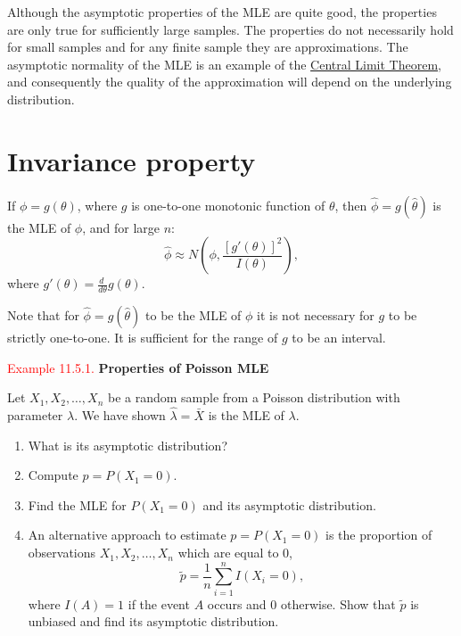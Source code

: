 \documentclass[
]{book}
\providecommand{\tightlist}{%
  \setlength{\itemsep}{0pt}\setlength{\parskip}{0pt}}
\begin{document}
Although the asymptotic properties of the MLE are quite good, the properties are only true for sufficiently large samples. The properties do not necessarily hold for small samples and for any finite sample they are approximations. The asymptotic normality of the MLE is an example of the \protect\hyperlink{Sec_CLT:statement}{Central Limit Theorem}, and consequently the quality of the approximation will depend on the underlying distribution.

\hypertarget{MLEprop:invariance}{%
\section{Invariance property}\label{MLEprop:invariance}}

If \(\phi = g(\theta)\), where \(g\) is one-to-one monotonic function of \(\theta\), then \(\hat{\phi} = g(\hat{\theta})\) is the MLE of \(\phi\), and for large \(n\):
\[ \hat{\phi} \approx N \left( \phi, \frac{ [g'(\theta)]^2 }{I(\theta)} \right),\]
where \(g'(\theta) = \frac{d \;}{d\theta} g(\theta)\).

Note that for \(\hat{\phi} = g(\hat{\theta})\) to be the MLE of \(\phi\) it is not necessary for \(g\) to be strictly one-to-one. It is sufficient for the range of \(g\) to be an interval.

\leavevmode{}%
\textcolor{red}{Example 11.5.1.}
{\textbf{Properties of Poisson MLE}}

Let \(X_1,X_2,\dots,X_n\) be a random sample from a Poisson distribution with parameter \(\lambda\). We have shown \(\hat{\lambda}=\bar{X}\) is the MLE of \(\lambda\).

\begin{enumerate}
\def\labelenumi{(\alph{enumi})}
\tightlist
\item
  What is its asymptotic distribution?\\
\item
  Compute \(p= P(X_1 = 0)\).\\
\item
  Find the MLE for \(P(X_1 = 0)\) and its asymptotic distribution.\\
\item
  An alternative approach to estimate \(p=P(X_1=0)\) is the proportion of observations \(X_1, X_2, \ldots, X_n\) which are equal to 0, \[\tilde{p} =  \frac{1}{n} \sum_{i=1}^n I(X_i =0), \] where \(I(A)=1\) if the event \(A\) occurs and 0 otherwise. Show that \(\tilde{p}\) is unbiased and find its asymptotic distribution.\\
\end{enumerate}
\end{document}
